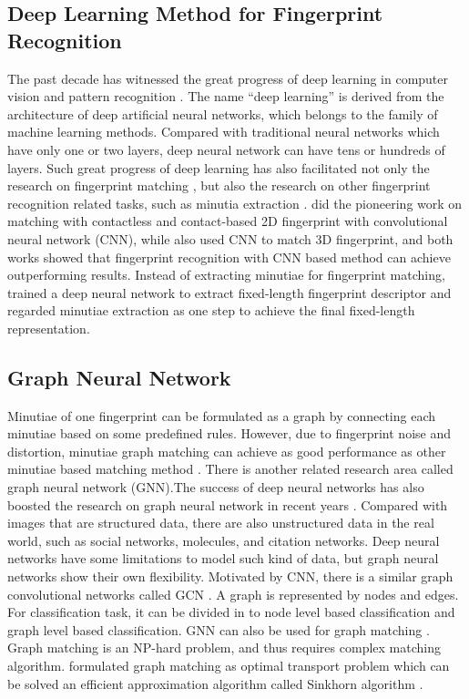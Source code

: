 \documentclass[12pt, a4paper]{article}
\begin{document}
\begin{spacing}{1}
    \subsection{Deep Learning Method for Fingerprint Recognition}
    The past decade has witnessed the great progress of deep learning in computer vision and pattern recognition \cite{HeCVPR2016ResNet} \cite{Simonyan2014VGG} \cite{SzegedyCVPR2015InceptionV1}. The name “deep learning” is derived from the architecture of deep artificial neural networks, which belongs to the family of machine learning methods. Compared with traditional neural networks which have only one or two layers, deep neural network can have tens or hundreds of layers. Such great progress of deep learning has also facilitated not only the research on fingerprint matching \cite{CaoTPAMI2018}, but also the research on other fingerprint recognition related tasks, such as minutia extraction \cite{TangIJCB2017} \cite{NguyenICB2018}. \cite{LinTIFS2018} did the pioneering work on matching with contactless and contact-based 2D fingerprint with convolutional neural network (CNN), while \cite{LinPR2018} also used CNN to match 3D fingerprint, and both works showed that fingerprint recognition with CNN based method can achieve outperforming results. Instead of extracting minutiae for fingerprint matching, \cite{EngelsmaTPAMI2019} trained a deep neural network to extract fixed-length fingerprint descriptor and regarded minutiae extraction as one step to achieve the final fixed-length representation.

    \subsection{Graph Neural Network}
    Minutiae of one fingerprint can be formulated as a graph by connecting each minutiae based on some predefined rules. However, due to fingerprint noise and distortion, minutiae graph matching can achieve as good performance as other minutiae based matching method \cite{ChikkerurICB2006}. There is another related research area called graph neural network (GNN).The success of deep neural networks has also boosted the research on graph neural network  in recent years \cite{WuTNNLS2020} \cite{ZhouAI2020} \cite{XuICLR2019GIN}. Compared with images that are structured data, there are also unstructured data in the real world, such as social networks, molecules, and citation networks. Deep neural networks have some limitations to model such kind of data, but graph neural networks show their own flexibility. Motivated by CNN, there is a similar graph convolutional networks called GCN \cite{KipfICLR2017}. A graph is represented by nodes and edges. For classification task, it can be divided in to node level based classification and graph level based classification. GNN can also be used for graph matching \cite{ZanfirCVPR2018} \cite{LiICML2019}. Graph matching is an NP-hard problem, and thus requires complex matching algorithm. \cite{SarlinCVPR2020superglue} formulated graph matching as optimal transport problem which can be solved an efficient approximation algorithm called Sinkhorn algorithm \cite{CuturiNIPS2013sinkhorn}. 
    

\end{spacing}
\end{document}

